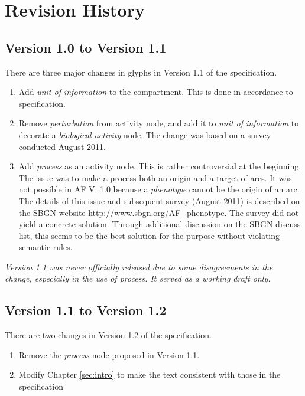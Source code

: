 \chapter{Revision History}

\section{Version 1.0 to Version 1.1}

There are three major changes in glyphs in Version 1.1 of the \SBGNAFLone specification. 
\begin{enumerate}
\item{Add \emph{unit of information} to the compartment.  This is done in accordance to \SBGNPDLone specification.}
\item{Remove \emph{perturbation} from activity node, and add it to \emph{unit of information} to decorate a \emph{biological activity} node.  The change was based on a survey conducted August 2011.
}
\item{Add \emph{process} as an activity node. This is rather controversial at the beginning.  The issue was to make a process both an origin and a target of arcs.  It was not possible in AF V. 1.0 because a \emph{phenotype} cannot be the origin of an arc.  The details of this issue and subsequent survey (August 2011) is described on the SBGN website \url{http://www.sbgn.org/AF_phenotype}. The survey did not yield a concrete solution.  Through additional discussion on the SBGN discuss list, this seems to be the best solution for the purpose without violating semantic rules.
}
\end{enumerate}

\textit{Version 1.1 was never officially released due to some disagreements in the change, especially in the use of process. It served as a working draft only.}

\section{Version 1.1 to Version 1.2}

There are two changes in Version 1.2 of the \SBGNAFLone specification. 
\begin{enumerate}
\item{Remove the \emph{process} node proposed in Version 1.1.}
\item{Modify Chapter \ref{sec:intro} to make the text consistent with those in the \SBGNPDLone specification}
\end{enumerate}

